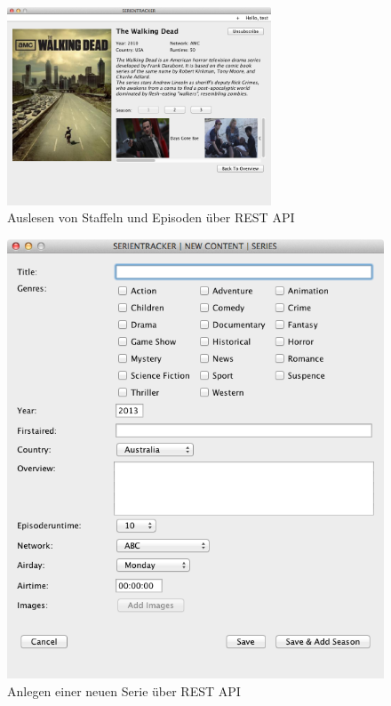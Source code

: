 \begin{figure}[H]
  \centering
\includegraphics[width=0.7\textwidth]{../images/screenshots/client-series-details.png}
\caption{Auslesen von Staffeln und Episoden über REST API}
\label{details}
\end{figure}

\begin{figure}[H]
\includegraphics[width=1\textwidth]{../images/screenshots/client-new-content.png}
\caption{Anlegen einer neuen Serie über REST API}
\label{newcontent}
\end{figure}

